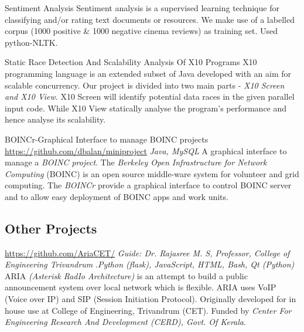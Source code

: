 \documentclass[11pt, a4paper, sans]{moderncv}
\begin{document}
{Sentiment Analysis}{}{}{}
{Sentiment analysis is a supervised learning technique for classifying and/or rating text documents or resources. We make use of a labelled corpus (1000 positive \& 1000 negative cinema reviews) as training set. Used python-NLTK. \newline}

{Static Race Detection And Scalability Analysis Of X10 Programs}{}{}{}
{X10 programming language is an extended subset of Java developed with an aim for
scalable concurrency. Our project is divided into two main parts - \textit{X10 Screen and X10 View}. X10 Screen will identify potential data races in the given parallel input code. While X10 View statically analyse the program's performance and hence analyse its scalability. \newline}

{BOINCr-Graphical Interface to manage BOINC projects}
{\newline \url{https://github.com/dbalan/miniproject}}{}
{\hfill \textit{Java, MySQL}}
{A graphical interface to manage a \textit{BOINC project}. The \textit{Berkeley Open Infrastructure for Network Computing} (BOINC) is an open source middle-ware system for volunteer and grid computing. The \textit{BOINCr} provide a graphical interface to control BOINC server and to allow easy deployment of BOINC apps and work units. \newline}

\fi

\subsection{Other Projects}

{\newline \url{https://github.com/AriaCET/}}
{\newline \textit{Guide: Dr. Rajasree M. S, Professor, College of Engineering Trivandrum}}
{\newline.\hfill \textit{Python (flask), JavaScript, HTML, Bash, Qt (Python)}}
{ARIA \textit{(Asterisk RadIo Architecture)} is an attempt to build a public announcement system over local network which is flexible. ARIA uses VoIP (Voice over IP) and SIP (Session Initiation Protocol). Originally developed for in house use at College of Engineering, Trivandrum (CET). Funded by \textit{Center For Engineering Research And Development (CERD), Govt. Of Kerala}. \newline}
\end{document}
